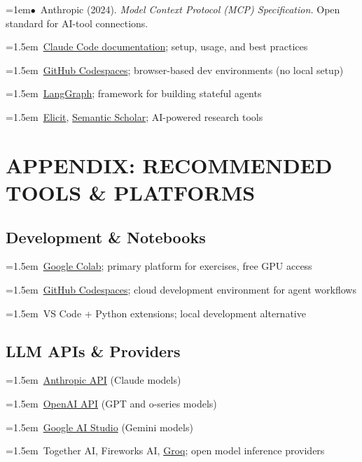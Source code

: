 \documentclass[11pt, a4paper]{article}
\newcommand{\seclabel}[1]{%
  \vspace{0.5em}{\normalsize\sffamily\bfseries\textcolor{accent}{#1}}\par\vspace{0.2em}
}
\newcommand{\refpaper}[1]{%
  \par\hangindent=1em\hangafter=1\noindent\textcolor{accent}{\small$\bullet$}~{\small #1}\par
}
\newcommand{\resource}[1]{%
  \par\hangindent=1.5em\hangafter=1\noindent\hspace{0.5em}{\small\textcolor{accent}{\guilsinglright}}~{\small #1}\par
}
\begin{document}
\refpaper{Anthropic (2024). \textit{Model Context Protocol (MCP) Specification.} Open standard for AI-tool connections.}

\seclabel{Further Resources}

\resource{\href{https://docs.anthropic.com/en/docs/claude-code}{Claude Code documentation}; setup, usage, and best practices}

\resource{\href{https://github.com/features/codespaces}{GitHub Codespaces}; browser-based dev environments (no local setup)}

\resource{\href{https://langchain-ai.github.io/langgraph/}{LangGraph}; framework for building stateful agents}

\resource{\href{https://elicit.com}{Elicit}, \href{https://www.semanticscholar.org}{Semantic Scholar}; AI-powered research tools}

\vspace{1.5em}




\section{APPENDIX: RECOMMENDED TOOLS \& PLATFORMS}

\subsection{Development \& Notebooks}

\resource{\href{https://colab.research.google.com}{Google Colab}; primary platform for exercises, free GPU access}
\resource{\href{https://github.com/features/codespaces}{GitHub Codespaces}; cloud development environment for agent workflows}
\resource{VS Code + Python extensions; local development alternative}

\subsection{LLM APIs \& Providers}

\resource{\href{https://docs.anthropic.com}{Anthropic API} (Claude models)}
\resource{\href{https://platform.openai.com}{OpenAI API} (GPT and o-series models)}
\resource{\href{https://aistudio.google.com}{Google AI Studio} (Gemini models)}
\resource{Together AI, Fireworks AI, \href{https://groq.com}{Groq}; open model inference providers}
\end{document}
